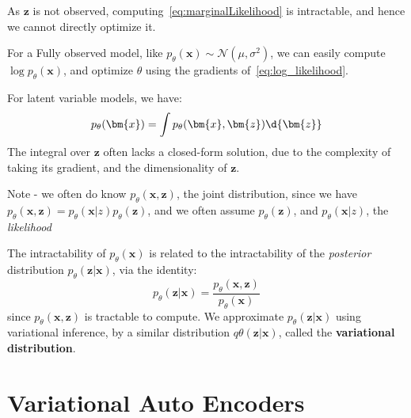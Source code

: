 \documentclass{article}
\begin{document}
\begin{remark} As $\bm{z}$ is not observed, computing~\cref{eq:marginalLikelihood} is intractable, and hence we cannot directly optimize it. 

  For a Fully observed model, like $p_{\theta}(\bm{x}) \sim \mathcal{N}( \mu, \sigma ^2)$, we can easily compute $\log p_{\theta}(\bm{x})$, and optimize $\theta$ using the gradients of~\ref{eq:log_likelihood}. 

For latent variable models, we have:
\[
  p_{\theta}(\bm{x}) = \int p_{\theta}(\bm{x}, \bm{z}) \d{\bm{z}}
\]
The integral over $\bm{z}$ often lacks a closed-form solution, due to the complexity of taking its gradient,  and the dimensionality of $\bm{z}$. 

  Note - we often do know $p_{\theta}(\bm{x}, \bm{z})$, the joint distribution, since we have $p_{\theta}(\bm{x}, \bm{z}) =  p_{\theta}(\bm{x} | z) p_{\theta}(\bm{z})$, and we often assume $p_{\theta}(\bm{z})$, and $p_{\theta}(\bm{x} | z)$, the \textit{likelihood} 

The intractability of $p_{\theta}(\bm{x})$ is related to the intractability of the \textit{posterior} distribution $p_{\theta}(\bm{z} | \bm{x})$, via the identity:
\[
  p_{\theta}(\bm{z} | \bm{x}) = \frac{p_{\theta}(\bm{x}, \bm{z})}{ p_{\theta}(\bm{x})}
\]
  since $p_{\theta}(\bm{x}, \bm{z})$ is tractable to compute. We approximate $p_{\theta}(\bm{z} | \bm{x})$ using variational inference, by a similar distribution $q \theta(\bm{z} | \bm{x})$, called the \textbf{variational distribution}. 
\end{remark}

\section{Variational Auto Encoders}
\end{document}
